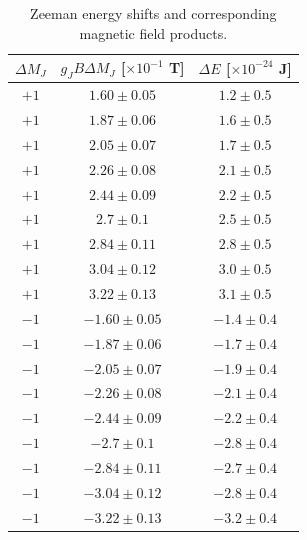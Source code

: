\begin{table}[H]
\centering
\begin{tabular}{ccc}
\hline
    $\Delta M_J$ & $g_J B \Delta M_J$ [$\times 10^{-1}$ T] & $\Delta E$ [$\times 10^{-24}$ J] \\
\hline
    $+1$ & $1.60 \pm 0.05$ & $1.2 \pm 0.5$ \\
    $+1$ & $1.87 \pm 0.06$ & $1.6 \pm 0.5$ \\
    $+1$ & $2.05 \pm 0.07$ & $1.7 \pm 0.5$ \\
    $+1$ & $2.26 \pm 0.08$ & $2.1 \pm 0.5$ \\
    $+1$ & $2.44 \pm 0.09$ & $2.2 \pm 0.5$ \\
    $+1$ & $2.7 \pm 0.1$ & $2.5 \pm 0.5$ \\
    $+1$ & $2.84 \pm 0.11$ & $2.8 \pm 0.5$ \\
    $+1$ & $3.04 \pm 0.12$ & $3.0 \pm 0.5$ \\
    $+1$ & $3.22 \pm 0.13$ & $3.1 \pm 0.5$ \\
    $-1$ & $-1.60 \pm 0.05$ & $-1.4 \pm 0.4$ \\
    $-1$ & $-1.87 \pm 0.06$ & $-1.7 \pm 0.4$ \\
    $-1$ & $-2.05 \pm 0.07$ & $-1.9 \pm 0.4$ \\
    $-1$ & $-2.26 \pm 0.08$ & $-2.1 \pm 0.4$ \\
    $-1$ & $-2.44 \pm 0.09$ & $-2.2 \pm 0.4$ \\
    $-1$ & $-2.7 \pm 0.1$ & $-2.8 \pm 0.4$ \\
    $-1$ & $-2.84 \pm 0.11$ & $-2.7 \pm 0.4$ \\
    $-1$ & $-3.04 \pm 0.12$ & $-2.8 \pm 0.4$ \\
    $-1$ & $-3.22 \pm 0.13$ & $-3.2 \pm 0.4$ \\
\hline
\end{tabular}
\caption{Zeeman energy shifts and corresponding magnetic field products.}
\label{tab:tidied}
\end{table}
